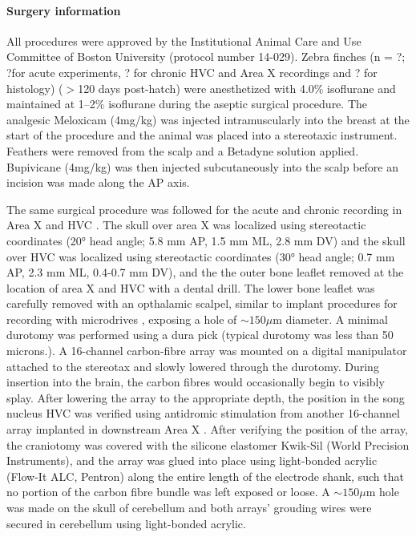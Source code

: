 \documentclass[10pt,letterpaper]{article}
\renewcommand{\subsubsection}[1]{\paragraph{#1}}
\begin{document}
\subsubsection{Surgery information}

All procedures were approved by the Institutional Animal Care and Use
Committee of Boston University (protocol number 14-029). Zebra finches
(n = ?; ?for acute experiments, ? for chronic HVC and Area X
recordings and ? for histology) ($>$120 days post-hatch) were
anesthetized with 4.0\% isoflurane and maintained at 1--2\% isoflurane
during the aseptic surgical procedure. The analgesic Meloxicam
(4mg/kg) was injected intramuscularly into the breast at the start of
the procedure and the animal was placed into a stereotaxic
instrument. Feathers were removed from the scalp and a Betadyne
solution applied. Bupivicane (4mg/kg) was then injected subcutaneously
into the scalp before an incision was made along the AP axis.

The same surgical procedure was followed for the acute and chronic
recording in Area X and HVC \cite{Guitchounts2013electrode}. The skull
over area X was localized using stereotactic coordinates (20° head
angle; 5.8 mm AP, 1.5 mm ML, 2.8 mm DV) and the skull over HVC was
localized using stereotactic coordinates (30° head angle; 0.7 mm AP,
2.3 mm ML, 0.4-0.7 mm DV), and the the outer bone leaflet removed at
the location of area X and HVC with a dental drill. The lower bone
leaflet was carefully removed with an opthalamic scalpel, similar to
implant procedures for recording with microdrives
\cite{Long2010synfire}, exposing a hole of $\sim 150 \mu$m diameter. A
minimal durotomy was performed using a dura pick (typical durotomy was
less than 50 microns.). A 16-channel carbon-fibre array
\cite{Guitchounts2013electrode} was mounted on a digital manipulator
attached to the stereotax and slowly lowered through the
durotomy. During insertion into the brain, the carbon fibres would
occasionally begin to visibly splay. After lowering the array to the
appropriate depth, the position in the song nucleus HVC was verified
using antidromic stimulation from another 16-channel array implanted
in downstream Area X
\cite{Hahnloser2002sparse,Guitchounts2013electrode}.  After verifying
the position of the array, the craniotomy was covered with the
silicone elastomer Kwik-Sil (World Precision Instruments), and the
array was glued into place using light-bonded acrylic (Flow-It ALC,
Pentron) along the entire length of the electrode shank, such that no
portion of the carbon fibre bundle was left exposed or loose. A $\sim
150\mu$m hole was made on the skull of cerebellum and both arrays’
grouding wires were secured in cerebellum using light-bonded acrylic.
\end{document}
